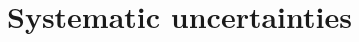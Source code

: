 

\chapter{Systematic uncertainties}

\ifpdf
    \graphicspath{{chapter-uncertainties/Figs/Raster/}{chapter-uncertainties/Figs/PDF/}{chapter-uncertainties/Figs/}}
\else
    \graphicspath{{chapter-uncertainties/Figs/Vector/}{chapter-uncertainties/Figs/}}
\fi



